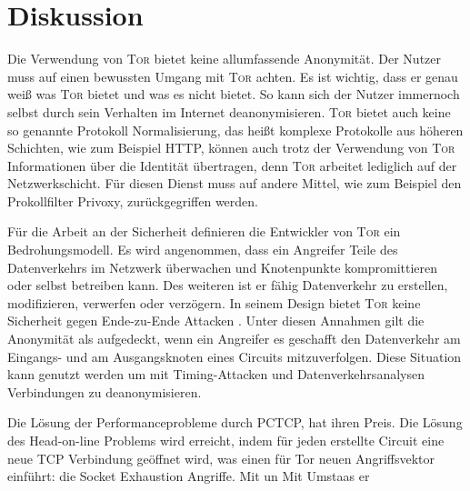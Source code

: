 \documentclass[fleqn,envcountsame,runningheads,10pt,a4paper]{llncs}
\begin{document}


\section{Diskussion}
\label{sec:discussion}

Die Verwendung von \textsc{Tor} bietet keine allumfassende Anonymität. Der Nutzer muss auf einen bewussten Umgang mit \textsc{Tor} achten. Es ist wichtig, dass er genau weiß was \textsc{Tor} bietet und was es nicht bietet. So kann sich der Nutzer immernoch selbst durch sein Verhalten im Internet deanonymisieren. \textsc{Tor} bietet auch keine so genannte Protokoll Normalisierung, das heißt komplexe Protokolle aus höheren Schichten, wie zum Beispiel HTTP, können auch trotz der Verwendung von \textsc{Tor} Informationen über die Identität übertragen, denn \textsc{Tor} arbeitet lediglich auf der Netzwerkschicht. Für diesen Dienst muss auf andere Mittel, wie zum Beispiel den Prokollfilter Privoxy, zurückgegriffen werden.

Für die Arbeit an der Sicherheit definieren die Entwickler von \textsc{Tor} ein Bedrohungsmodell. Es wird angenommen, dass ein Angreifer Teile des Datenverkehrs im Netzwerk überwachen und Knotenpunkte kompromittieren oder selbst betreiben kann. Des weiteren ist er fähig Datenverkehr zu erstellen, modifizieren, verwerfen oder verzögern. In seinem Design bietet \textsc{Tor} keine Sicherheit gegen Ende-zu-Ende Attacken \cite{tor}. Unter diesen Annahmen gilt die Anonymität als aufgedeckt, wenn ein Angreifer es geschafft den Datenverkehr am Eingangs- und am Ausgangsknoten eines Circuits mitzuverfolgen. Diese Situation kann genutzt werden um mit Timing-Attacken und Datenverkehrsanalysen Verbindungen zu deanonymisieren.

Die Lösung der Performanceprobleme durch PCTCP, hat ihren Preis. Die Lösung des Head-on-line Problems wird erreicht, indem für jeden erstellte Circuit eine neue TCP Verbindung geöffnet wird, was einen für Tor neuen Angriffsvektor einführt: die Socket Exhaustion Angriffe. Mit un Mit    Umstaas er
\end{document}
